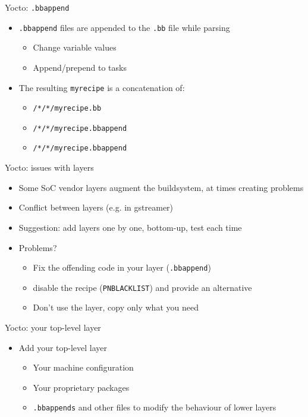 \documentclass[xetex,table,aspectratio=43]{beamer}
\begin{document}
\begin{frame}{Yocto: {\tt .bbappend}}
  \begin{itemize}
  \item {\tt .bbappend} files are appended to the {\tt .bb} file while
    parsing
    \begin{itemize}
    \item Change variable values
    \item Append/prepend to tasks
    \end{itemize}
  \item The resulting {\tt myrecipe} is a concatenation of:
    \begin{itemize}
    \item {\tt <LAYER1>/*/*/myrecipe.bb}
    \item {\tt <LAYER2>/*/*/myrecipe.bbappend}
    \item {\tt <LAYER3>/*/*/myrecipe.bbappend}
    \end{itemize}
  \end{itemize}
\end{frame}

\begin{frame}[fragile]{Yocto: issues with layers}
  \begin{itemize}
  \item Some SoC vendor layers augment the buildsystem, at times
    creating problems
  \item Conflict between layers (e.g. in gstreamer)
  \item Suggestion: add layers one by one, bottom-up, test each time
  \item Problems?
    \begin{itemize}
    \item Fix the offending code in your layer ({\tt .bbappend})
    \item disable the recipe ({\tt PNBLACKLIST}) and provide an alternative
    \item Don't use the layer, copy only what you need
    \end{itemize}
  \end{itemize}
\end{frame}

\begin{frame}[fragile]{Yocto: your top-level layer}
  \begin{itemize}
  \item Add your top-level layer
    \begin{itemize}
    \item Your machine configuration
    \item Your proprietary packages
    \item {\tt .bbappends} and other files to modify the behaviour of
      lower layers
    \end{itemize}
\end{itemize}
\end{frame}
\end{document}

